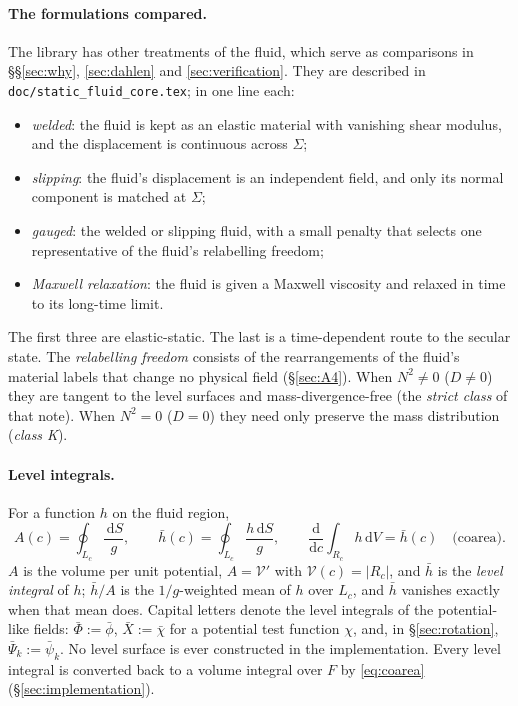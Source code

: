 \documentclass[11pt]{article}
\theoremstyle{definition}
\theoremstyle{remark}
\newcommand{\dS}{\,\mathrm{d}S}
\newcommand{\dV}{\,\mathrm{d}V}
\newcommand{\Vol}{\mathcal V}
\newcommand{\code}[1]{\texttt{#1}}
\begin{document}
\paragraph{The formulations compared.} The library has other
treatments of the fluid, which serve as comparisons in
\S\S\ref{sec:why}, \ref{sec:dahlen} and \ref{sec:verification}. They
are described in \code{doc/static\_fluid\_core.tex}; in one line each:
\begin{itemize}
\item \emph{welded}: the fluid is kept as an elastic material with
  vanishing shear modulus, and the displacement is continuous across
  $\Sigma$;
\item \emph{slipping}: the fluid's displacement is an independent
  field, and only its normal component is matched at $\Sigma$;
\item \emph{gauged}: the welded or slipping fluid, with a small penalty
  that selects one representative of the fluid's relabelling freedom;
\item \emph{Maxwell relaxation}: the fluid is given a Maxwell viscosity
  and relaxed in time to its long-time limit.
\end{itemize}
The first three are elastic-static. The last is a time-dependent
route to the secular state. The \emph{relabelling freedom} consists of
the rearrangements of the fluid's material labels that change no
physical field (\S\ref{sec:A4}). When $N^2 \ne 0$ ($D \ne 0$) they are
tangent to the level surfaces and mass-divergence-free (the
\emph{strict class} of that note). When $N^2 = 0$ ($D = 0$) they need
only preserve the mass distribution (\emph{class K}).

\paragraph{Level integrals.} For a function $h$ on the fluid region,
\begin{equation}
  A(c) = \oint_{L_c}\frac{\dS}{g},
  \qquad
  \bar h(c) = \oint_{L_c}\frac{h\dS}{g},
  \qquad
  \frac{\mathrm d}{\mathrm dc}\int_{R_c}h\dV = \bar h(c)
  \quad\text{(coarea)} .
  \label{eq:coarea}
\end{equation}
$A$ is the volume per unit potential, $A = \Vol'$ with $\Vol(c) =
|R_c|$, and $\bar h$ is the \emph{level integral} of $h$; $\bar h/A$ is
the $1/g$-weighted mean of $h$ over $L_c$, and $\bar h$ vanishes
exactly when that mean does. Capital letters denote the level
integrals of the potential-like fields: $\bar\Phi := \bar\phi$, $\bar
X := \bar\chi$ for a potential test function $\chi$, and, in
\S\ref{sec:rotation}, $\bar\Psi_k := \bar\psi_k$. No level surface is
ever constructed in the implementation. Every level integral is
converted back to a volume integral over $F$ by \eqref{eq:coarea}
(\S\ref{sec:implementation}).
\end{document}
